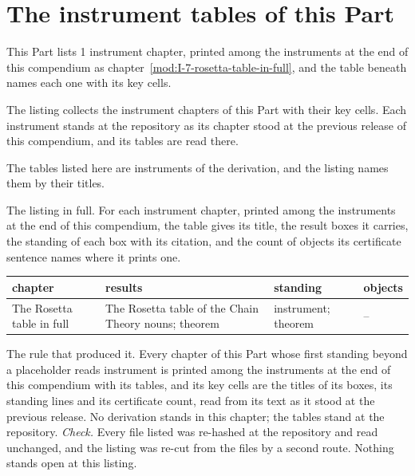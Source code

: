 \section{The instrument tables of this Part}\label{mod:I-L-the-instrument-tables-at-the-repository}
\begin{chtable}\label{box:I-L-the-instrument-tables-at-the-repository:1}
This Part lists 1 instrument chapter, printed among the instruments at the end of this compendium as chapter~\ref{mod:I-7-rosetta-table-in-full}, and the table beneath names each one with its key cells.
\end{chtable}
The listing collects the instrument chapters of this Part with their key cells. Each instrument stands at the repository as its chapter stood at the previous release of this compendium, and its tables are read there.
\begin{chbridge}
The tables listed here are instruments of the derivation, and the listing names them by their titles.
\end{chbridge}
\begin{chproof}[instrument]
The listing in full. For each instrument chapter, printed among the instruments at the end of this compendium, the table gives its title, the result boxes it carries, the standing of each box with its citation, and the count of objects its certificate sentence names where it prints one.
{\small
\begin{longtable}{p{38mm}p{63mm}p{30mm}p{14mm}}
\hline
chapter & results & standing & objects \\
\hline
\endhead
The Rosetta table in full & The Rosetta table of the Chain Theory nouns; theorem & instrument; theorem & -- \\
\hline
\end{longtable}
}
The rule that produced it. Every chapter of this Part whose first standing beyond a placeholder reads instrument is printed among the instruments at the end of this compendium with its tables, and its key cells are the titles of its boxes, its standing lines and its certificate count, read from its text as it stood at the previous release.
No derivation stands in this chapter; the tables stand at the repository.
\emph{Check.} Every file listed was re-hashed at the repository and read unchanged, and the listing was re-cut from the files by a second route.
Nothing stands open at this listing.
\end{chproof}
\label{chend:I-L-the-instrument-tables-at-the-repository}
